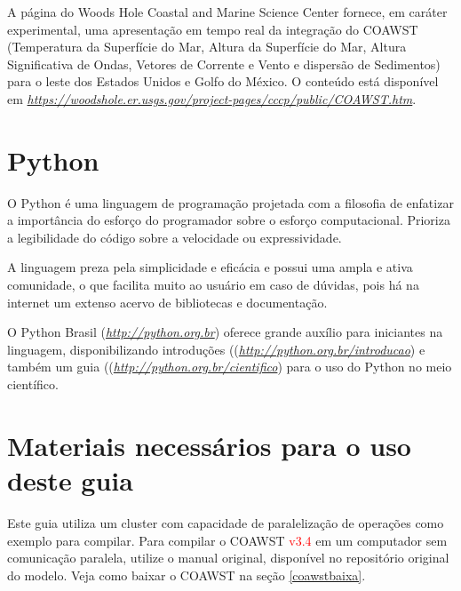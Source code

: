 \noindent A página do Woods Hole Coastal and Marine Science Center fornece, em caráter experimental, uma apresentação em 
          tempo real da integração do COAWST (Temperatura da Superfície do Mar, Altura da Superfície do Mar, Altura Significativa
          de Ondas, Vetores de Corrente e Vento e dispersão de Sedimentos) para o leste dos Estados Unidos e Golfo do México.
          O conteúdo está disponível em \textcolor{bleu_cite}{\href{https://woodshole.er.usgs.gov/project-pages/cccp/public/COAWST.htm}{\textit{https://woodshole.er.usgs.gov/project-pages/cccp/public/COAWST.htm}}}.
\bigskip

\section{Python}
\bigskip

\noindent O Python é uma linguagem de programação projetada com a filosofia de enfatizar a importância 
          do esforço do programador sobre o esforço computacional. Prioriza a legibilidade do código sobre 
          a velocidade ou expressividade.
\bigskip

\noindent A linguagem preza pela simplicidade e eficácia e possui uma ampla e ativa comunidade, o que facilita muito ao
         usuário em caso de dúvidas, pois há na internet um extenso acervo de bibliotecas e documentação.
\bigskip

\noindent O Python Brasil (\textcolor{bleu_cite}{\href{http://python.org.br}{\textit{http://python.org.br}}}) oferece
          grande auxílio para iniciantes na linguagem, disponibilizando introduções ((\textcolor{bleu_cite}{\href{http://python.org.br/introducao}{\textit{http://python.org.br/introducao}}}) 
          e também um guia ((\textcolor{bleu_cite}{\href{http://python.org.br/cientifico}{\textit{http://python.org.br/cientifico}}}) para o uso do 
          Python no meio científico.



\section{Materiais necessários para o uso deste guia}
\bigskip

\noindent Este guia utiliza um cluster com capacidade de paralelização de operações como exemplo para compilar. Para compilar o COAWST \textcolor{red}{v3.4}
          em um computador sem comunicação paralela, utilize o manual original, disponível no repositório original do modelo. 
          Veja como baixar o COAWST na seção \textcolor{bleu_cite}{\ref{coawstbaixa}}.
\bigskip


